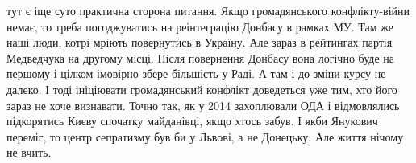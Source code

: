  
 
 
 
 

\begin{cmtfront}
\large{}

тут є іще суто практична сторона питання. Якщо громадянського конфлікту-війни
немає, то треба погоджуватись на реінтеграцію Донбасу в рамках МУ. Там же наші
люди, котрі мріють повернутись в Україну. Але зараз в рейтингах партія
Медведчука на другому місці. Після повернення Донбасу вона логічно буде на
першому і цілком імовірно збере більшість у Раді. А там і до зміни курсу не
далеко. І тоді ініціювати громадянський конфлікт доведеться уже тим, хто його
зараз не хоче визнавати. Точно так, як у 2014 захоплювали ОДА і відмовлялись
підкорятись Києву спочатку майданівці, якщо хтось забув. І якби Янукович
переміг, то центр сепратизму був би у Львові, а не Донецьку. Але життя нічому
не вчить.

\end{cmtfront}
